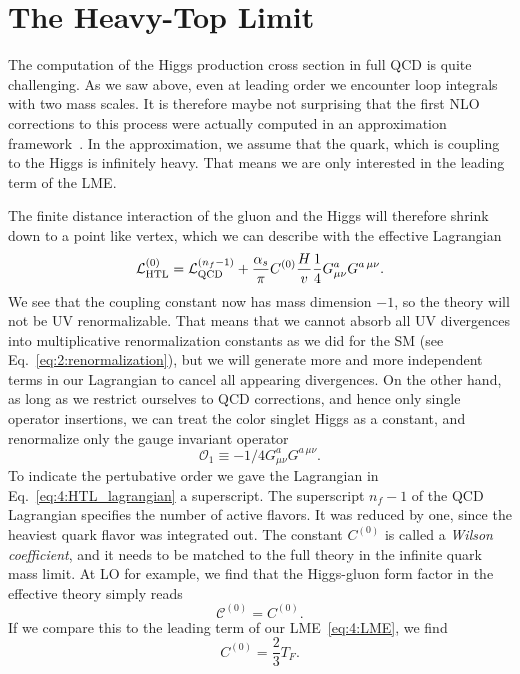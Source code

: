 \section{The Heavy-Top Limit} \label{sec:4:HTL}
The computation of the Higgs production cross section in full \acs{QCD} is quite challenging. As we saw above, even at leading order we encounter loop integrals with two mass scales. It is therefore maybe not surprising that the first \acs{NLO} corrections to this process were actually computed in an approximation framework~\cite{Dawson:1990zj}. In the approximation, we assume that the quark, which is coupling to the Higgs is infinitely heavy. That means we are only interested in the leading term of the \acs{LME}.

The finite distance interaction of the gluon and the Higgs will therefore shrink down to a point like vertex, which we can describe with the effective Lagrangian
\begin{equation}
\mathcal{L}_{\text{HTL}}^{(0)} = \mathcal{L}_{\text{QCD}}^{(n_f - 1)} + \frac{\alpha_s}{\pi} C^{(0)} \frac{H}{v} \frac{1}{4} G^a_{\mu \nu} G^{a\, \mu\nu}.
\label{eq:4:HTL_lagrangian}
\end{equation}
We see that the coupling constant now has mass dimension $-1$, so the theory will not be \acs{UV} renormalizable. That means that we cannot absorb all \acs{UV} divergences into multiplicative renormalization constants as we did for the \acs{SM} (see Eq.~\eqref{eq:2:renormalization}), but we will generate more and more independent terms in our Lagrangian to cancel all appearing divergences. On the other hand, as long as we restrict ourselves to \acs{QCD} corrections, and hence only single operator insertions, we can treat the color singlet Higgs as a constant, and renormalize only the gauge invariant operator
\begin{equation}
\mathcal{O}_1 \equiv - 1/4 G_{\mu\nu}^a G^{a\, \mu\nu}.
\end{equation}
To indicate the pertubative order we gave the Lagrangian in Eq.~\eqref{eq:4:HTL_lagrangian} a superscript. The superscript $n_f - 1$ of the QCD Lagrangian specifies the number of active flavors. It was reduced by one, since the heaviest quark flavor was integrated out. The constant $C^{(0)}$ is called a \textit{Wilson coefficient}, and it needs to be matched to the full theory in the infinite quark mass limit. At \acs{LO} for example, we find that the Higgs-gluon form factor in the effective theory simply reads
\begin{equation}
\mathcal{C}^{(0)} = C^{(0)}.
\end{equation}
If we compare this to the leading term of our \acs{LME}~\eqref{eq:4:LME}, we find
\begin{equation}
C^{(0)} = \frac{2}{3} T_F.
\end{equation}

